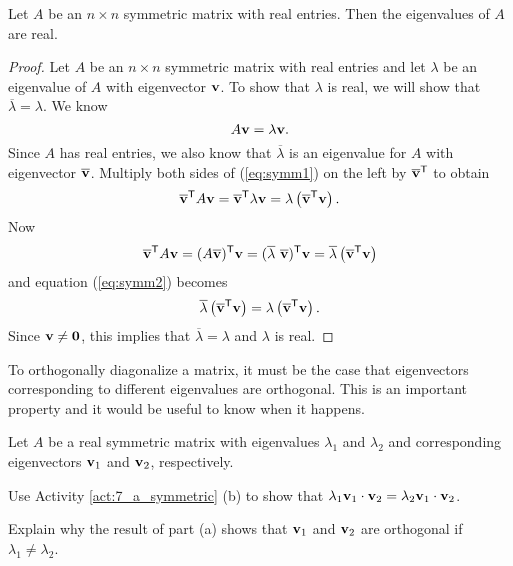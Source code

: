 \begin{theorem} \label{thm:7_a_symmetric_eigenvalues} Let $A$ be an $n\times n$ symmetric matrix with real entries. Then the eigenvalues of $A$ are real.
\end{theorem}

\begin{proof} Let $A$ be an $n\times n$ symmetric matrix with real entries and let $\lambda$ be an eigenvalue of $A$ with eigenvector $\mathbf{v}$. To show that $\lambda$ is real, we will show that $\overline{\lambda} = \lambda$. We know
\begin{equation}
A \mathbf{v} = \lambda \mathbf{v}. \label{eq:symm1}
\end{equation}
Since $A$ has real entries, we also know that $\overline{\lambda}$ is an eigenvalue for $A$ with eigenvector $\overline{\mathbf{v}}$.  Multiply both sides of (\ref{eq:symm1}) on the left by $\overline{\mathbf{v}}^{\mathsf{T}}$ to obtain
\begin{equation}
\overline{\mathbf{v}}^{\mathsf{T}} A \mathbf{v} = \overline{\mathbf{v}}^{\mathsf{T}} \lambda \mathbf{v} = \lambda \left(\overline{\mathbf{v}}^{\mathsf{T}} \mathbf{v} \right). \label{eq:symm2}
\end{equation}
Now
\begin{equation*}
\overline{\vv}^{\tr} A \vv = (A\overline{\vv})^{\tr} \vv = (\overline{\lambda} \ \overline{\vv})^{\tr} \vv = \overline{\lambda} \left(\overline{\vv}^{\tr} \vv \right)
\end{equation*}
and equation (\ref{eq:symm2}) becomes
\[\overline{\lambda} \left(\overline{\mathbf{v}}^{\mathsf{T}} \mathbf{v} \right) = \lambda \left(\overline{\mathbf{v}}^{\mathsf{T}} \mathbf{v} \right).\]
Since $\mathbf{v} \neq \mathbf{0}$, this implies that $\overline{\lambda} = \lambda$ and $\lambda$ is real.
\end{proof}

To orthogonally diagonalize a matrix, it must be the case that eigenvectors corresponding to different eigenvalues are orthogonal. This is an important property and it would be useful to know when it happens.


\begin{activity} \label{act:7_a_symmetric_eigenvalues} Let $A$ be a real symmetric matrix with eigenvalues $\lambda_1$ and $\lambda_2$ and corresponding eigenvectors $\mathbf{v}_1$ and $\mathbf{v}_2$, respectively. 
	\ba
	\item Use Activity \ref{act:7_a_symmetric} (b) to show that $\lambda_1 \mathbf{v}_1\cdot \mathbf{v}_2 = \lambda_2 \mathbf{v}_1 \cdot \mathbf{v}_2$.

	\item Explain why the result of part (a) shows that $\mathbf{v}_1$ and $\mathbf{v}_2$ are orthogonal if $\lambda_1\neq \lambda_2$.
	
	\ea
	
\end{activity}


